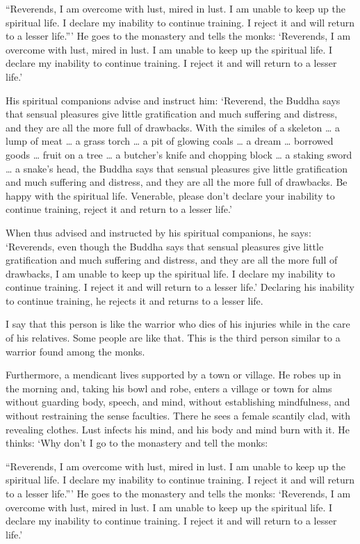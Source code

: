 \documentclass[12pt,openany]{book}%
\begin{document}
“Reverends, I am overcome with lust, mired in lust. I am unable to keep up the spiritual life. I declare my inability to continue training. I reject it and will return to a lesser life.”’ He goes to the monastery and tells the monks: ‘Reverends, I am overcome with lust, mired in lust. I am unable to keep up the spiritual life. I declare my inability to continue training. I reject it and will return to a lesser life.’ 

His spiritual companions advise and instruct him: ‘Reverend, the Buddha says that sensual pleasures give little gratification and much suffering and distress, and they are all the more full of drawbacks. With the similes of a skeleton … a lump of meat … a grass torch … a pit of glowing coals … a dream … borrowed goods … fruit on a tree … a butcher’s knife and chopping block … a staking sword … a snake’s head, the Buddha says that sensual pleasures give little gratification and much suffering and distress, and they are all the more full of drawbacks. Be happy with the spiritual life. Venerable, please don’t declare your inability to continue training, reject it and return to a lesser life.’ 

When thus advised and instructed by his spiritual companions, he says: ‘Reverends, even though the Buddha says that sensual pleasures give little gratification and much suffering and distress, and they are all the more full of drawbacks, I am unable to keep up the spiritual life. I declare my inability to continue training. I reject it and will return to a lesser life.’ Declaring his inability to continue training, he rejects it and returns to a lesser life. 

I say that this person is like the warrior who dies of his injuries while in the care of his relatives. Some people are like that. This is the third person similar to a warrior found among the monks. 

Furthermore, a mendicant lives supported by a town or village. He robes up in the morning and, taking his bowl and robe, enters a village or town for alms without guarding body, speech, and mind, without establishing mindfulness, and without restraining the sense faculties. There he sees a female scantily clad, with revealing clothes. Lust infects his mind, and his body and mind burn with it. He thinks: ‘Why don’t I go to the monastery and tell the monks: 

“Reverends, I am overcome with lust, mired in lust. I am unable to keep up the spiritual life. I declare my inability to continue training. I reject it and will return to a lesser life.”’ He goes to the monastery and tells the monks: ‘Reverends, I am overcome with lust, mired in lust. I am unable to keep up the spiritual life. I declare my inability to continue training. I reject it and will return to a lesser life.’ 
\end{document}
